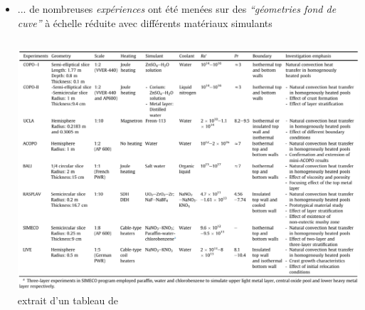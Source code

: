 \begin{frame}[fragile]
\begin{itemize}
\item ... de nombreuses \emph{expériences} ont été menées sur des  \emph{``géometries fond de cuve''} à échelle réduite avec différents matériaux simulants
\begin{columns}[T]
    \begin{column}{0.72\textwidth}
      \includegraphics[height=0.8\textheight]{Figures/Tab3_Zhang2015.eps} \\
      {\tiny extrait d'un tableau de \cite{Zhang2015}}
    \end{column}
\end{columns}
\end{itemize}
\end{frame}
